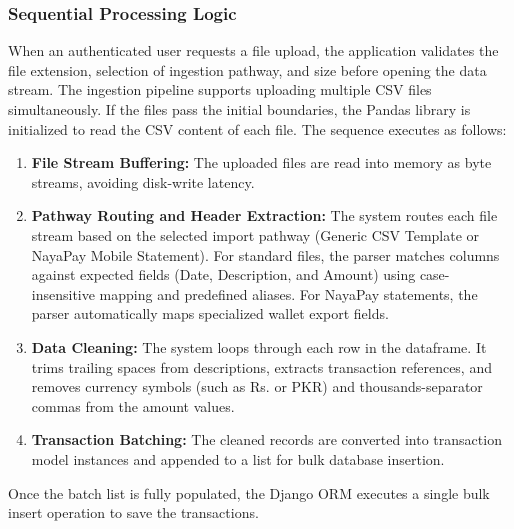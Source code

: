 \subsubsection{Sequential Processing Logic}
When an authenticated user requests a file upload, the application validates the file extension, selection of ingestion pathway, and size before opening the data stream. The ingestion pipeline supports uploading multiple CSV files simultaneously. If the files pass the initial boundaries, the Pandas library is initialized to read the CSV content of each file. The sequence executes as follows:
\begin{enumerate}
	\item \textbf{File Stream Buffering:} The uploaded files are read into memory as byte streams, avoiding disk-write latency.
	\item \textbf{Pathway Routing and Header Extraction:} The system routes each file stream based on the selected import pathway (Generic CSV Template or NayaPay Mobile Statement). For standard files, the parser matches columns against expected fields (Date, Description, and Amount) using case-insensitive mapping and predefined aliases. For NayaPay statements, the parser automatically maps specialized wallet export fields.
	\item \textbf{Data Cleaning:} The system loops through each row in the dataframe. It trims trailing spaces from descriptions, extracts transaction references, and removes currency symbols (such as Rs. or PKR) and thousands-separator commas from the amount values.
	\item \textbf{Transaction Batching:} The cleaned records are converted into transaction model instances and appended to a list for bulk database insertion.
\end{enumerate}
Once the batch list is fully populated, the Django ORM executes a single bulk insert operation to save the transactions.

